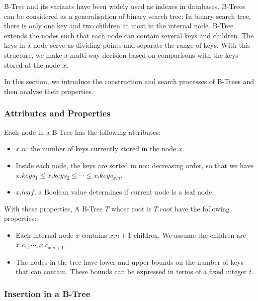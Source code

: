 B-Tree and its variants have been widely used as indexes in databases. B-Trees can be considered as a generalisation of binary search tree: In binary search tree, there is only one key and two children at most in the internal node. B-Tree extends the nodes such that each node can contain several keys and children. The keys in a node serve as dividing points and separate the range of keys. With this structure, we make a multi-way decision based on comparisons with the keys stored at the node $x$.

In this section, we introduce the construction and search processes
of B-Trees and then analyse their properties.

\subsubsection{Attributes and Properties}

Each node in a B-Tree has the following attributes:

\begin{itemize}
\item
  $x.n$: the number of keys currently stored in the node $x$.
\item Inside each node, the keys are sorted in non decreasing order, so that we have $x.keys_1\leq x.keys_2\leq\cdots\leq x.keys_{x.n}$.
\item
  $x.leaf$, a Boolean value determines if current node is a leaf node.
\end{itemize}

With these properties, A B-Tree $T$ whose root is $T.root$ have the
following properties:

\begin{itemize}
\item
  Each internal node $x$ contains $x.n+1$ children. We assume the
  children are $x.c_1,\cdots,x.c_{x.n+1}$.
\item
  The nodes in the tree have lower and upper bounds on the number of
  keys that can contain. These bounds can be expressed in terms of a
  fixed integer $t$.
\end{itemize}


\subsubsection{Insertion in a B-Tree}


